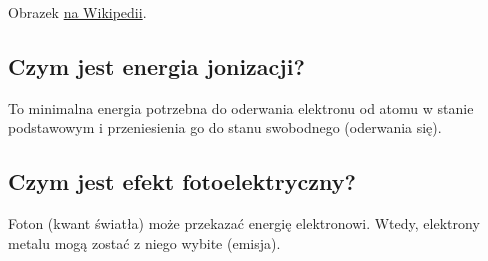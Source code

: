 Obrazek \href{https://en.wikipedia.org/wiki/Bohr_model#/media/File:Bohr_atom_model.svg}{na Wikipedii}.


\subsection{Czym jest energia jonizacji?}

To minimalna energia potrzebna do oderwania elektronu od atomu w stanie podstawowym i przeniesienia go do stanu swobodnego (oderwania się).

\subsection{Czym jest efekt fotoelektryczny?}

Foton (kwant światła) może przekazać energię elektronowi. Wtedy, elektrony metalu mogą zostać z niego wybite (emisja).
